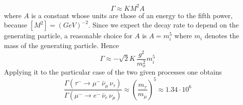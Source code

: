 \begin{equation*}
    \Gamma \approx K M^2 A
\end{equation*}
where $A$ is a constant whose units are those of an energy to the fifth power, because $[M^2] = (GeV)^{-2}$. Since we expect the decay rate 
to depend on the generating particle, a reasonable choice for $A$ is $A=m_i^5$ where $m_i$ denotes the mass of the generating particle. Hence
\begin{equation*}
    \Gamma \approx - \sqrt{2} K \, \frac{g^2}{m_x^2}m_i^5
\end{equation*}
Applying it to the particular case of the two given processes one obtains
\begin{equation*}
    \frac{\Gamma\left(\tau^- \rightarrow \mu^- \, \bar\nu_{\mu} \, \nu_{\tau}\right)}{\Gamma\left( \mu^- \rightarrow e^- \, \bar\nu_e \, \nu_{\mu}\right)}
    \approx \left(\frac{m_{\tau}}{m_{\mu}}\right)^5 \approx 1.34 \cdot 10^6
\end{equation*}